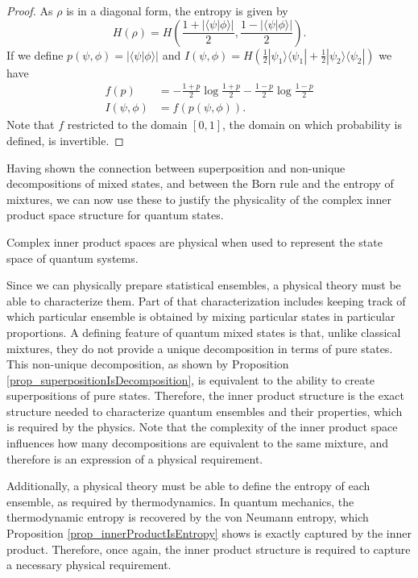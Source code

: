 \documentclass[10pt,twocolumn, nofootinbib]{revtex4-2}
\def\>{\rangle}
\def\<{\langle}
\begin{document}
\begin{proof}
As $\rho$ is in a diagonal form, the entropy is given by
\begin{equation}\label{entropy}
	H(\rho) = H\left(\frac{1+|\langle\psi|\phi\rangle|}{2}, \frac{1-|\langle\psi|\phi\rangle|}{2}\right).
\end{equation}
If we define $p(\psi, \phi) = |\langle\psi|\phi\rangle|$ and $I(\psi, \phi) = H( \frac{1}{2}|\psi_1\>\<\psi_1| + \frac{1}{2}|\psi_2\>\<\psi_2|)$ we have
\begin{align}\label{entropy}
	f(p) & = - \frac{1+p}{2} \log \frac{1+p}{2} 
	- \frac{1-p}{2} \log \frac{1-p}{2} \\
	I(\psi, \phi) &= f(p(\psi, \phi)).
\end{align}
Note that $f$ restricted to the domain $[0,1]$, the domain on which probability is defined, is invertible.
\end{proof}

Having shown the connection between superposition and non-unique decompositions of mixed states, and between the Born rule and the entropy of mixtures, we can now use these to justify the physicality of the complex inner product space structure for quantum states.
\begin{prop}
Complex inner product spaces are physical when used to represent the state space of quantum systems.
\end{prop}
\begin{justification}
Since we can physically prepare statistical ensembles, a physical theory must be able to characterize them. Part of that characterization includes keeping track of which particular ensemble is obtained by mixing particular states in particular proportions. A defining feature of quantum mixed states is that, unlike classical mixtures, they do not provide a unique decomposition in terms of pure states. This non-unique decomposition, as shown by Proposition \ref{prop_superpositionIsDecomposition}, is equivalent to the ability to create superpositions of pure states. Therefore, the inner product structure is the exact structure needed to characterize quantum ensembles and their properties, which is required by the physics. Note that the complexity of the inner product space influences how many decompositions are equivalent to the same mixture, and therefore is an expression of a physical requirement.

Additionally, a physical theory must be able to define the entropy of each ensemble, as required by thermodynamics. In quantum mechanics, the thermodynamic entropy is recovered by the von Neumann entropy, which Proposition \ref{prop_innerProductIsEntropy} shows is exactly captured by the inner product. Therefore, once again, the inner product structure is required to capture a necessary physical requirement.
\end{justification}
\end{document}
